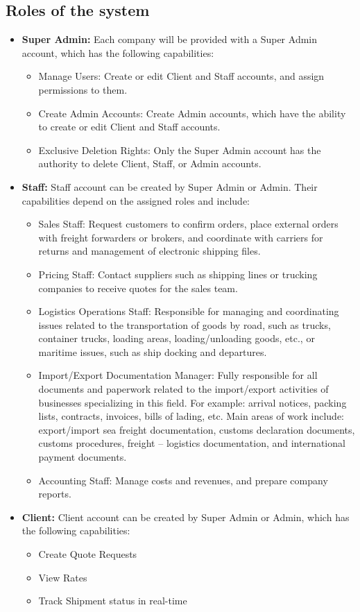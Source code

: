 \subsection{Roles of the system}
\begin{itemize}
    \item \textbf{Super Admin:} Each company will be provided with a Super Admin account, which has the following capabilities:
    \begin{itemize}
        \item Manage Users: Create or edit Client and Staff accounts, and assign permissions to them.
        \item Create Admin Accounts: Create Admin accounts, which have the ability to create or edit Client and Staff accounts.
        \item Exclusive Deletion Rights: Only the Super Admin account has the authority to delete Client, Staff, or Admin accounts.
    \end{itemize}
    \item \textbf{Staff:} Staff account can be created by Super Admin or Admin. Their capabilities depend on the assigned roles and include:
    \begin{itemize}
        \item Sales Staff: Request customers to confirm orders, place external orders with freight forwarders or brokers, and coordinate with carriers for returns and management of electronic shipping files.
        \item Pricing Staff: Contact suppliers such as shipping lines or trucking companies to receive quotes for the sales team.
        \item Logistics Operations Staff: Responsible for managing and coordinating issues related to the transportation of goods by road, such as trucks, container trucks, loading areas, loading/unloading goods, etc., or maritime issues, such as ship docking and departures.
        \item Import/Export Documentation Manager: Fully responsible for all documents and paperwork related to the import/export activities of businesses specializing in this field. For example: arrival notices, packing lists, contracts, invoices, bills of lading, etc. Main areas of work include: export/import sea freight documentation, customs declaration documents, customs procedures, freight – logistics documentation, and international payment documents.
        \item Accounting Staff: Manage costs and revenues, and prepare company reports.
    \end{itemize}
    \item \textbf{Client:} Client account can be created by Super Admin or Admin, which has the following capabilities:
    \begin{itemize}
        \item Create Quote Requests
        \item View Rates
        \item Track Shipment status in real-time
    \end{itemize}
\end{itemize}
